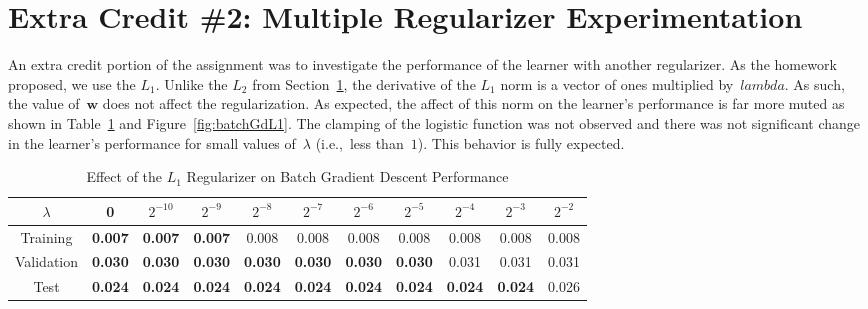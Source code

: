\documentclass{report}
\newcommand{\w}{\mathbf{w}}
\begin{document}
  \section{Extra Credit \#2: Multiple Regularizer Experimentation}

  An extra credit portion of the assignment was to investigate the performance of the learner with another regularizer.  As the homework proposed, we use the $L_1$.  Unlike the $L_2$ from Section~\ref{}, the derivative of the $L_1$ norm is a vector of ones multiplied by~$lambda$.  As such, the value of~$\w$ does not affect the regularization.  As expected, the affect of this norm on the learner's performance is far more muted as shown in Table~\ref{tab:batchGradientDescentL1} and Figure~\ref{fig:batchGdL1}.  The clamping of the logistic function was not observed and there was not significant change in the learner's performance for small values of~$\lambda$ (i.e.,~less than~$1$).  This behavior is fully expected.

  \begin{table}[]
    \centering
    \caption{Effect of the $L_1$ Regularizer on Batch Gradient Descent Performance}
    \label{tab:batchGradientDescentL1}
    \begin{tabular}{c||c|c|c|c|c|c|c|c|c|c}
      \hline
      $\lambda$  & 0              & $2^{-10}$ & $2^{-9}$ & $2^{-8}$       & $2^{-7}$ & $2^{-6}$ & $2^{-5}$ & $2^{-4}$ & $2^{-3}$ & $2^{-2}$ \\ \hline
      Training   & \textbf{0.007} & \textbf{0.007}     & \textbf{0.007}    & 0.008 & 0.008    & 0.008    & 0.008    & 0.008    & 0.008    & 0.008    \\ \hline
      Validation & \textbf{0.030} & \textbf{0.030}    & \textbf{0.030}    & \textbf{0.030} & \textbf{0.030}    & \textbf{0.030}    & \textbf{0.030}    & 0.031    & 0.031    & 0.031    \\ \hline
      Test       & \textbf{0.024} & \textbf{0.024}     & \textbf{0.024}    & \textbf{0.024} & \textbf{0.024}    & \textbf{0.024}    & \textbf{0.024}    & \textbf{0.024}    & \textbf{0.024}    & 0.026    \\ \hline
    \end{tabular}
  \end{table}
\end{document}
